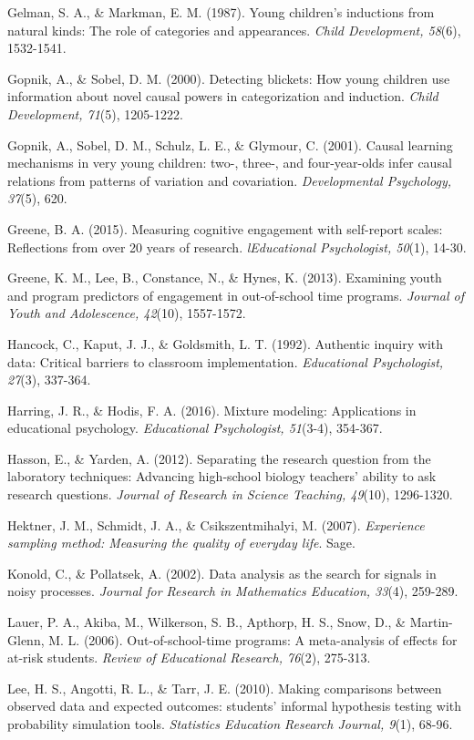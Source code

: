 \documentclass[]{book}
\theoremstyle{definition}
\theoremstyle{definition}
\theoremstyle{definition}
\theoremstyle{remark}
\begin{document}
Gelman, S. A., \& Markman, E. M. (1987). Young children's inductions
from natural kinds: The role of categories and appearances. \emph{Child
Development, 58}(6), 1532-1541.

Gopnik, A., \& Sobel, D. M. (2000). Detecting blickets: How young
children use information about novel causal powers in categorization and
induction. \emph{Child Development, 71}(5), 1205-1222.

Gopnik, A., Sobel, D. M., Schulz, L. E., \& Glymour, C. (2001). Causal
learning mechanisms in very young children: two-, three-, and
four-year-olds infer causal relations from patterns of variation and
covariation. \emph{Developmental Psychology, 37}(5), 620.

Greene, B. A. (2015). Measuring cognitive engagement with self-report
scales: Reflections from over 20 years of research. \emph{lEducational
Psychologist, 50}(1), 14-30.

Greene, K. M., Lee, B., Constance, N., \& Hynes, K. (2013). Examining
youth and program predictors of engagement in out-of-school time
programs. \emph{Journal of Youth and Adolescence, 42}(10), 1557-1572.

Hancock, C., Kaput, J. J., \& Goldsmith, L. T. (1992). Authentic inquiry
with data: Critical barriers to classroom implementation.
\emph{Educational Psychologist, 27}(3), 337-364.

Harring, J. R., \& Hodis, F. A. (2016). Mixture modeling: Applications
in educational psychology. \emph{Educational Psychologist, 51}(3-4),
354-367.

Hasson, E., \& Yarden, A. (2012). Separating the research question from
the laboratory techniques: Advancing high‐school biology teachers'
ability to ask research questions. \emph{Journal of Research in Science
Teaching, 49}(10), 1296-1320.

Hektner, J. M., Schmidt, J. A., \& Csikszentmihalyi, M. (2007).
\emph{Experience sampling method: Measuring the quality of everyday
life}. Sage.

Konold, C., \& Pollatsek, A. (2002). Data analysis as the search for
signals in noisy processes. \emph{Journal for Research in Mathematics
Education, 33}(4), 259-289.

Lauer, P. A., Akiba, M., Wilkerson, S. B., Apthorp, H. S., Snow, D., \&
Martin-Glenn, M. L. (2006). Out-of-school-time programs: A meta-analysis
of effects for at-risk students. \emph{Review of Educational Research,
76}(2), 275-313.

Lee, H. S., Angotti, R. L., \& Tarr, J. E. (2010). Making comparisons
between observed data and expected outcomes: students' informal
hypothesis testing with probability simulation tools. \emph{Statistics
Education Research Journal, 9}(1), 68-96.
\end{document}
